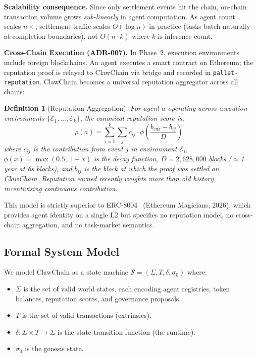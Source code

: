 \documentclass{article}
\newtheorem{definition}{Definition}
\begin{document}
\noindent\textbf{Scalability consequence.} Since only settlement events hit the chain, on-chain transaction volume grows \emph{sub-linearly} in agent computation. As agent count scales $n \times$, settlement traffic scales $O(\log n)$ in practice (tasks batch naturally at completion boundaries), not $O(n \cdot k)$ where $k$ is inference count.

\noindent\textbf{Cross-Chain Execution (ADR-007).} In Phase~2, execution environments include foreign blockchains. An agent executes a smart contract on Ethereum; the reputation proof is relayed to ClawChain via bridge and recorded in \texttt{pallet-reputation}. ClawChain becomes a universal reputation aggregator across all chains:

\begin{definition}[Reputation Aggregation]
For agent $a$ operating across execution environments $\{\mathcal{E}_1, \ldots, \mathcal{E}_k\}$, the canonical reputation score is:
\[
  \rho(a) = \sum_{i=1}^{k} \sum_{j} c_{ij} \cdot \phi\!\left(\frac{b_{\mathrm{cur}} - b_{ij}}{D}\right)
\]
where $c_{ij}$ is the contribution from event $j$ in environment $\mathcal{E}_i$, $\phi(x) = \max(0.5,\, 1 - x)$ is the decay function, $D = 2{,}628{,}000$ blocks ($\approx$1 year at 6s blocks), and $b_{ij}$ is the block at which the proof was settled on ClawChain. Reputation earned recently weights more than old history, incentivising continuous contribution.
\end{definition}

\noindent This model is strictly superior to ERC-8004~\cite{erc8004} (Ethereum Magicians, 2026), which provides agent identity on a single L2 but specifies no reputation model, no cross-chain aggregation, and no task-market semantics.

\subsection{Formal System Model}

We model ClawChain as a state machine $\mathcal{S} = (\Sigma, T, \delta, \sigma_0)$ where:
\begin{itemize}
    \item $\Sigma$ is the set of valid world states, each encoding agent registries, token balances, reputation scores, and governance proposals.
    \item $T$ is the set of valid transactions (extrinsics).
    \item $\delta: \Sigma \times T \rightarrow \Sigma$ is the state transition function (the runtime).
    \item $\sigma_0$ is the genesis state.
\end{itemize}
\end{document}
